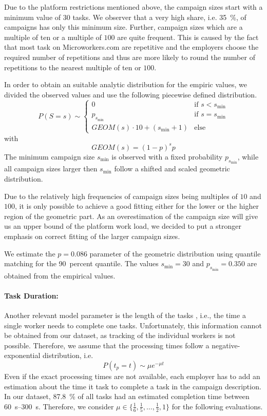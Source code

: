 Due to the platform restrictions mentioned above, the campaign sizes start with a minimum value of \(30\) tasks.
We observer that a very high share, i.e. \SI{35}{\percent}, of campaigns has only this minimum size.
Further, campaign sizes which are a multiple of ten or a multiple of \(100\) are quite frequent.
This is caused by the fact that most task on Microworkers.com are repetitive and the employers choose the required number of repetitions and thus are more likely to round the number of repetitions to the nearest multiple of ten or \(100\).

In order to obtain an suitable analytic distribution for the empiric values, we divided the observed values and use the following piecewise defined distribution.
\begin{equation*}
P(S=s) \sim
\begin{cases}
  0 & \text{if } s < s_{\min}\\
  p_{s_{\min}} & \text{if } s=s_{\min} \\
  GEOM(s) \cdot 10 + (s_{\min}+1) & \text{else}
\end{cases}
\end{equation*}
with 
\begin{equation*}
GEOM(s) = {(1-p)}^s p
\end{equation*}
The minimum campaign size \(s_{\min}\) is observed with a fixed probability \(p_{s_{\min}}\), while all campaign sizes larger then \(s_{\min}\) follow a shifted and scaled geometric distribution.

Due to the relatively high frequencies of campaign sizes being multiples of \(10\) and \(100\), it is only possible to achieve a good fitting either for the lower or the higher region of the geometric part.
As an overestimation of the campaign size will give us an upper bound of the platform work load, we decided to put a stronger emphasis on correct fitting of the larger campaign sizes.

We estimate the \(p=0.086\) parameter of the geometric distribution using quantile matching for the \SI{90}{percent} quantile.
The values \(s_{\min}=30\) and \(p_{s_{\min}}=0.350\) are obtained from the empirical values.

\paragraph*{Task Duration: }Another relevant model parameter is the length of the tasks \taskDuration, i.e., the time a single worker needs to complete one tasks.
Unfortunately, this information cannot be obtained from our dataset, as tracking of the individual workers is not possible.
Therefore, we assume that the processing times follow a negative-exponential distribution, i.e.
\begin{equation*}
P(t_p=t) \sim \mu  e^{-{\mu}t}
\end{equation*}
Even if the exact processing times are not available, each employer has to add an estimation about the time it task to complete a task in the campaign description.
In our dataset, \SI{87.8}{\percent} of all tasks had an estimated completion time between \SIrange{60}{300}{\second}.
Therefore, we consider \(\mu \in \{\frac{1}{6},\frac{1}{5},\hdots,\frac{1}{2},1\}\) for the following evaluations.

